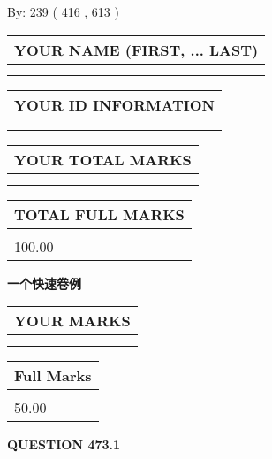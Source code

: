 \documentclass{ctexart}
\begin{document}
   
\hspace{1.0in} By: 
 239 ( 416 ,  613 )
   
   
   
   
\newpage 
\setcounter{page}{ 
   473001 } 
   
   
   
   
\noindent\begin{tabular}{|l|}
\hline
YOUR NAME (FIRST, ... LAST)  \\
\hline
 \\ 
 \\ 
\hline
\end{tabular}
\hspace{0.05in} \begin{tabular}{|l|}
\hline
 YOUR   ID   INFORMATION  \\
\hline
 \\ 
 \\ 
\hline
\end{tabular}
   
   
\vspace{0.2in}\noindent\begin{tabular}{|l|}
\hline
YOUR TOTAL MARKS  \\
\hline
 \\ 
 \\ 
\hline
\end{tabular}
\hspace{0.05in} \begin{tabular}{|l|}
\hline
TOTAL FULL MARKS  \\
\hline
 \\ 
100.00 \\
\hline
\end{tabular}
   
   
 \vspace{0.2in}
{\LARGE {\textbf{ 一个快速卷例}}}
   
   
  
\vspace{0.2in}
  
\noindent\begin{tabular}{|l|}
\hline
 YOUR MARKS  \\
\hline
 \\ 
 \\ 
\hline
\end{tabular}
\hspace{0.05in} \begin{tabular}{|l|}
\hline
 Full Marks  \\
\hline
 \\ 
50.00 \\
\hline
\end{tabular}
{\textbf{\Large{QUESTION
473.1 
}}}
  
\end{document}
